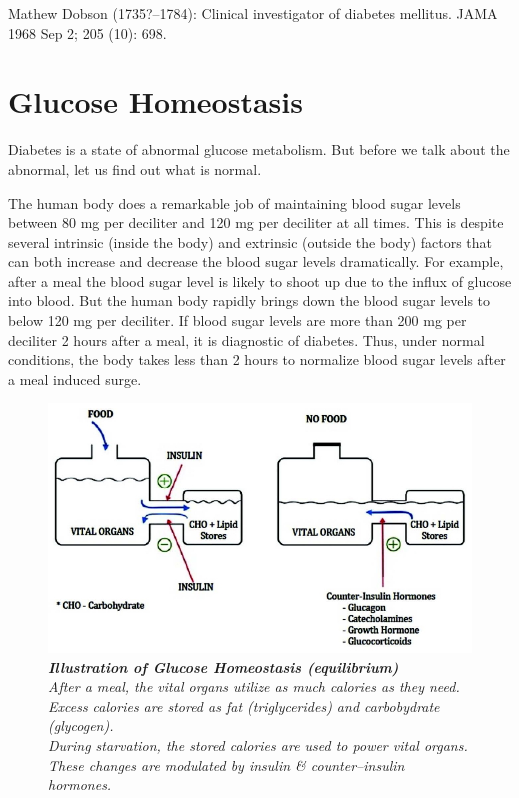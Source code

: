 \begin{thebibliography}{99}
 Mathew Dobson (1735?–1784): Clinical investigator of diabetes mellitus. JAMA 1968 Sep 2; 205 (10): 698.
\end{thebibliography}



\chapter{Glucose Homeostasis}

Diabetes is a state of abnormal glucose metabolism. But before we talk about the abnormal, let us find out what is normal.

The human body does a remarkable job of maintaining blood sugar levels between 80 mg per deciliter and 120 mg per deciliter at all times. This is despite several intrinsic (inside the body) and extrinsic (outside the body) factors that can both increase and decrease the blood sugar levels dramatically. For example, after a meal the blood sugar level is likely to shoot up due to the influx of glucose into blood. But the human body rapidly brings down the blood sugar levels to below 120 mg per deciliter. If blood sugar levels are more than 200 mg per deciliter 2 hours after a meal, it is diagnostic of diabetes. Thus, under normal conditions, the body takes less than 2 hours to normalize blood sugar levels after a meal induced surge.

\begin{figure}
\includegraphics{images/017.jpg}
\caption{\textbf{\textit{Illustration of Glucose Homeostasis (equilibrium)}}\\\textit{After a meal, the vital organs utilize as much calories as they need.\\ Excess calories are stored as fat (triglycerides) and carbobydrate (glycogen).\\ During starvation, the stored calories are used to power vital organs.\\ These changes are modulated by insulin \& counter–insulin hormones.}}
\end{figure}

